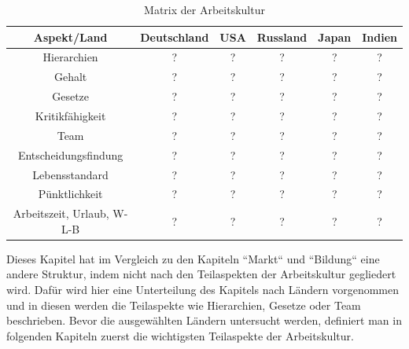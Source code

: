 \begin{table}[htp]
\begin{tabular}{|c|c|c|c|c|c|}
\hline  Aspekt/Land& Deutschland & USA & Russland & Japan & Indien \\ 
\hline 	Hierarchien  & ? & ? & ? & ? & ? \\ 
\hline  Gehalt& ? & ? & ? & ? & ? \\ 
\hline  Gesetze& ? & ? & ? & ? & ?  \\ 
\hline  Kritikfähigkeit& ? & ? & ? & ? & ? \\ 
\hline  Team& ? & ? & ? & ? & ?\\ 
\hline  Entscheidungsfindung& ? & ? & ? & ? & ?  \\ 
\hline  Lebensstandard& ? & ? & ? & ? & ? \\ 
\hline  Pünktlichkeit& ? & ? & ? & ? & ?\\ 
\hline  Arbeitszeit, Urlaub, W-L-B& ? & ? & ? & ? & ?\\ 
\hline 
\end{tabular} 
\caption{Matrix der Arbeitskultur}
\end{table}
%
Dieses Kapitel hat im Vergleich zu den Kapiteln ``Markt`` und ``Bildung`` eine andere Struktur, indem nicht nach den Teilaspekten der Arbeitskultur gegliedert wird. Dafür wird hier eine Unterteilung des Kapitels nach Ländern vorgenommen und in diesen werden die Teilaspekte wie Hierarchien, Gesetze oder Team beschrieben.
Bevor die ausgewählten Ländern untersucht werden, definiert man in folgenden Kapiteln zuerst die wichtigsten Teilaspekte der Arbeitskultur.
